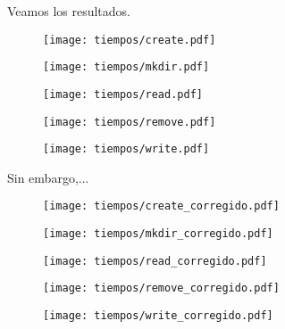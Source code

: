 Veamos los resultados.


\begin{figure}[H]
  \centering
  \begin{minipage}[b]{0.49\textwidth}
    \texttt{[image: tiempos/create.pdf]}
    \caption{}
  \end{minipage}
  \begin{minipage}[b]{0.49\textwidth}
    \texttt{[image: tiempos/mkdir.pdf]}
    \caption{}
  \end{minipage}
  \hfill
\end{figure}
\begin{figure}[H]
  \centering
  \begin{minipage}[b]{0.49\textwidth}
    \texttt{[image: tiempos/read.pdf]}
    \caption{}
  \end{minipage}
  \begin{minipage}[b]{0.49\textwidth}
    \texttt{[image: tiempos/remove.pdf]}
    \caption{}
  \end{minipage}
\end{figure}
\begin{figure}[H]
  \centering
  \texttt{[image: tiempos/write.pdf]}
  \caption{}
\end{figure}

Sin embargo,...

\begin{figure}[H]
  \centering
  \begin{minipage}[b]{0.49\textwidth}
    \texttt{[image: tiempos/create\_corregido.pdf]}
    \caption{}
  \end{minipage}
  \begin{minipage}[b]{0.49\textwidth}
    \texttt{[image: tiempos/mkdir\_corregido.pdf]}
    \caption{}
  \end{minipage}
\end{figure}
\begin{figure}[H]
  \begin{minipage}[b]{0.49\textwidth}
    \texttt{[image: tiempos/read\_corregido.pdf]}
    \caption{}
  \end{minipage}
  \begin{minipage}[b]{0.49\textwidth}
    \texttt{[image: tiempos/remove\_corregido.pdf]}
    \caption{}
  \end{minipage}
\end{figure}
\begin{figure}[H]
  \centering
  \texttt{[image: tiempos/write\_corregido.pdf]}
  \caption{}
\end{figure}


